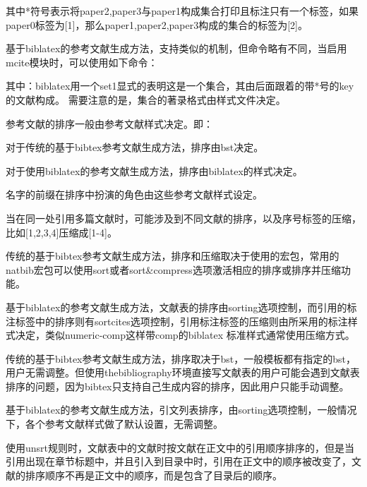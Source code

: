 其中*符号表示将paper2,paper3与paper1构成集合打印且标注只有一个标签，如果paper0标签为[1]，那么paper1,paper2,paper3构成的集合的标签为[2]。

基于biblatex的参考文献生成方法，支持类似的机制，但命令略有不同，当启用mcite模块时，可以使用如下命令：

\begin{texlist}
\end{texlist}

其中：biblatex用一个set1显式的表明这是一个集合，其由后面跟着的带*号的key的文献构成。
需要注意的是，集合的著录格式由样式文件决定。




参考文献的排序一般由参考文献样式决定。即：

对于传统的基于bibtex参考文献生成方法，排序由bst决定。

对于使用biblatex的参考文献生成方法，排序由biblatex的样式决定。

名字的前缀在排序中扮演的角色由这些参考文献样式设定。





当在同一处引用多篇文献时，可能涉及到不同文献的排序，以及序号标签的压缩，比如[1,2,3,4]压缩成[1-4]。

传统的基于bibtex参考文献生成方法，排序和压缩取决于使用的宏包，常用的natbib宏包可以使用sort或者sort\&compress选项激活相应的排序或排序并压缩功能。

基于biblatex的参考文献生成方法，文献表的排序由sorting选项控制，而引用的标注标签中的排序则有sortcites选项控制，引用标注标签的压缩则由所采用的标注样式决定，类似numeric-comp这样带comp的biblatex 标准样式通常使用压缩方式。




传统的基于bibtex参考文献生成方法，排序取决于bst，一般模板都有指定的bst，用户无需调整。但使用thebibliography环境直接写文献表的用户可能会遇到文献表排序的问题，因为bibtex只支持自己生成内容的排序，因此用户只能手动调整。

基于biblatex的参考文献生成方法，引文列表排序，由sorting选项控制，一般情况下，各个参考文献样式做了默认设置，无需调整。




使用unsrt规则时，文献表中的文献时按文献在正文中的引用顺序排序的，但是当引用出现在章节标题中，并且引入到目录中时，引用在正文中的顺序被改变了，文献的排序顺序不再是正文中的顺序，而是包含了目录后的顺序。

